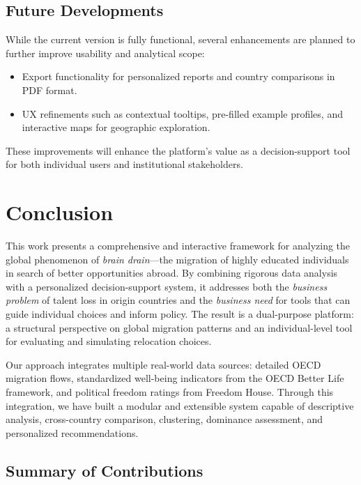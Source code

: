 \documentclass[11pt]{article}
\begin{document}
\subsection{Future Developments}

\noindent
While the current version is fully functional, several enhancements are planned to further improve usability and analytical scope:
\begin{itemize}
\item Export functionality for personalized reports and country comparisons in PDF format.
\item UX refinements such as contextual tooltips, pre-filled example profiles, and interactive maps for geographic exploration.
\end{itemize}
These improvements will enhance the platform’s value as a decision-support tool for both individual users and institutional stakeholders.


\newpage

\section{Conclusion}

\noindent
This work presents a comprehensive and interactive framework for analyzing the global phenomenon of \textit{brain drain}—the migration of highly educated individuals in search of better opportunities abroad. By combining rigorous data analysis with a personalized decision-support system, it addresses both the \textit{business problem} of talent loss in origin countries and the \textit{business need} for tools that can guide individual choices and inform policy. The result is a dual-purpose platform: a structural perspective on global migration patterns and an individual-level tool for evaluating and simulating relocation choices.

\medskip
\noindent
Our approach integrates multiple real-world data sources: detailed OECD migration flows, standardized well-being indicators from the OECD Better Life framework, and political freedom ratings from Freedom House. Through this integration, we have built a modular and extensible system capable of descriptive analysis, cross-country comparison, clustering, dominance assessment, and personalized recommendations.

\subsection{Summary of Contributions}
\end{document}
